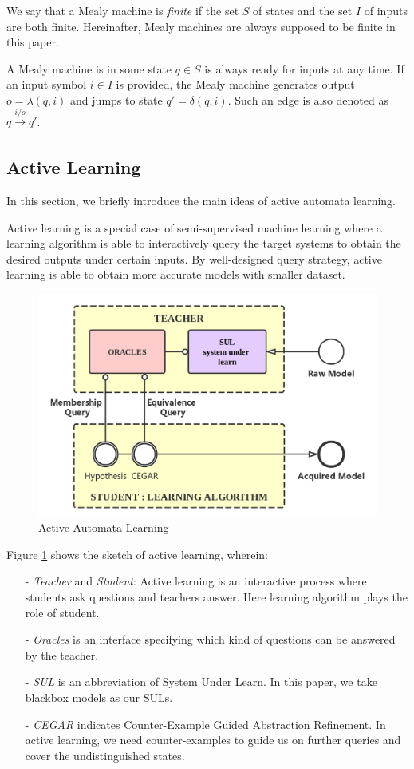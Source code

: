 \documentclass[conference, a4paper]{IEEEtran}
\begin{document}
We say that a Mealy machine is \emph{finite} if the set $S$ of states and the set $I$ of inputs are
both finite. Hereinafter, Mealy machines are always supposed to be finite in this paper.

A Mealy machine is in some state $q\in S$ is always ready for inputs at any time. If an input symbol
$i\in I$ is provided, the Mealy machine generates output $o=\lambda(q,i)$ and jumps to state
$q'=\delta(q,i)$. Such an edge is also denoted as $q\xrightarrow[]{i/o}q'$.


\subsection{Active Learning}
In this section, we briefly introduce the main ideas of active automata learning. 

Active learning \cite{settles2010active} is a special case of semi-supervised machine learning where
a learning algorithm is able to interactively query the target systems to obtain the desired outputs
under certain inputs. By well-designed query strategy, active learning is able to obtain more
accurate models with smaller dataset. 

\begin{figure}[ht]
  \begin{center}
    \includegraphics[width=.5\textwidth]{./images/activelearning.png}
  \end{center}
  \caption{Active Automata Learning}
  \label{fig:activelearning}
\end{figure}

Figure \ref{fig:activelearning} shows the sketch of active learning, wherein:
\begin{itemize}
  \item[-] \emph{Teacher} and \emph{Student}: Active learning is an interactive process where
    students ask questions and teachers answer. Here learning algorithm plays the role of student.
  \item[-] \emph{Oracles} is an interface specifying which kind of questions can be answered by the
    teacher.
  \item[-] \emph{SUL} is an abbreviation of System Under Learn. In this paper, we take blackbox
    models as our SULs.
  \item[-] \emph{CEGAR} indicates Counter-Example Guided Abstraction
    Refinement\cite{DBLP:conf/cav/ClarkeGJLV00}. In active learning, we need counter-examples to
    guide us on further queries and cover the undistinguished states.
\end{itemize}
\end{document}
